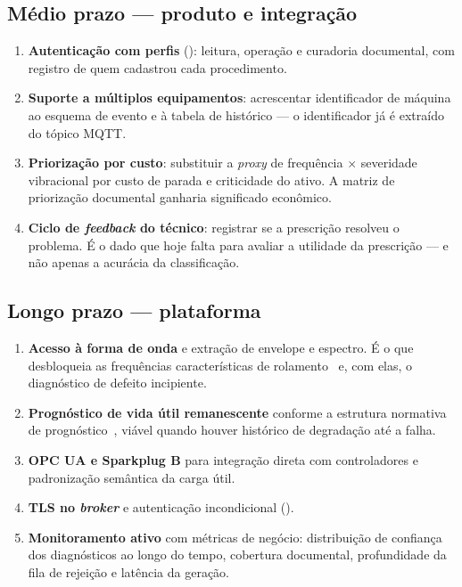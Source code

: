 \subsection{Médio prazo --- produto e integração}

\begin{enumerate}
  \item \textbf{Autenticação com perfis} (): leitura, operação e
    curadoria documental, com registro de quem cadastrou cada procedimento.
  \item \textbf{Suporte a múltiplos equipamentos}: acrescentar identificador de
    máquina ao esquema de evento e à tabela de histórico --- o identificador já
    é extraído do tópico MQTT.
  \item \textbf{Priorização por custo}: substituir a \textit{proxy} de
    frequência $\times$ severidade vibracional por custo de parada e criticidade
    do ativo. A matriz de priorização documental ganharia significado
    econômico.
  \item \textbf{Ciclo de \textit{feedback} do técnico}: registrar se a
    prescrição resolveu o problema. É o dado que hoje falta para avaliar a
    utilidade da prescrição --- e não apenas a acurácia da classificação.
\end{enumerate}

\subsection{Longo prazo --- plataforma}

\begin{enumerate}
  \item \textbf{Acesso à forma de onda} e extração de envelope e espectro. É o
    que desbloqueia as frequências características de
    rolamento~\cite{randall2011tutorial} e, com elas, o diagnóstico de defeito
    incipiente.
  \item \textbf{Prognóstico de vida útil remanescente} conforme a estrutura
    normativa de prognóstico~\cite{iso13381}, viável quando houver histórico de
    degradação até a falha.
  \item \textbf{OPC UA e Sparkplug B} para integração direta com controladores e
    padronização semântica da carga útil.
  \item \textbf{TLS no \textit{broker}} e autenticação incondicional
    ().
  \item \textbf{Monitoramento ativo} com métricas de negócio: distribuição de
    confiança dos diagnósticos ao longo do tempo, cobertura documental,
    profundidade da fila de rejeição e latência da geração.
\end{enumerate}

